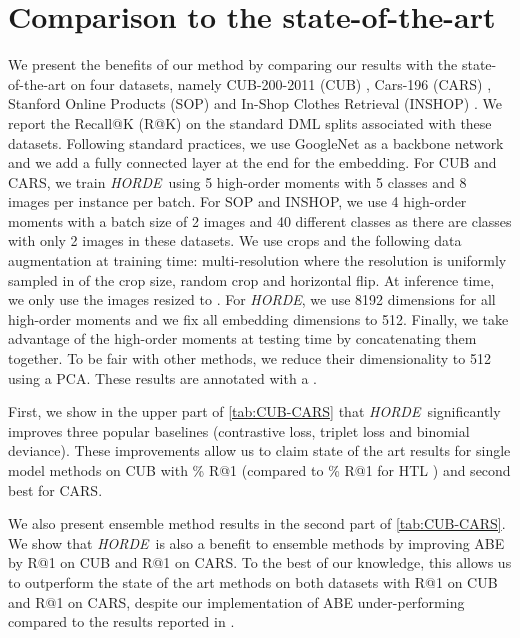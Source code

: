 \documentclass[10pt,twocolumn,letterpaper]{article}
\def\ourmethod{\textit{HORDE}}
\begin{document}
     

\section{Comparison to the state-of-the-art}\label{sec:sota}
    We present the benefits of our method by comparing our results with the state-of-the-art on four datasets, namely CUB-200-2011 (CUB) \cite{CUB_200_2011}, Cars-196 (CARS) \cite{CARS_196}, Stanford Online Products (SOP) \cite{Song_2016_CVPR} and In-Shop Clothes Retrieval (INSHOP) \cite{Liu_2016_CVPR_INSHOP}.
    We report the Recall@K (R@K) on the standard DML splits associated with these datasets.
    Following standard practices, we use GoogleNet \cite{Szegedy_2015_CVPR} as a backbone network and we add a fully connected layer at the end for the embedding.
For CUB and CARS, we train \ourmethod \ using 5 high-order moments with 5 classes and 8 images per instance per batch.
    For SOP and INSHOP, we use 4 high-order moments with a batch size of 2 images and 40 different classes as there are classes with only 2 images in these datasets.
    We use  crops and the following data augmentation at training time: multi-resolution where the resolution is uniformly sampled in  of the crop size, random crop and horizontal flip.
    At inference time, we only use the images resized to .
    For \ourmethod, we use 8192 dimensions for all high-order moments and we fix all embedding dimensions to 512.
    Finally, we take advantage of the high-order moments at testing time by concatenating them together.
    To be fair with other methods, we reduce their dimensionality to 512 using a PCA.
    These results are annotated with a .
    
    First, we show in the upper part of \autoref{tab:CUB-CARS} that \ourmethod \ significantly improves three popular baselines (contrastive loss, triplet loss and binomial deviance).
    These improvements allow us to claim state of the art results for single model methods on CUB with \% R@1 (compared to \% R@1 for HTL \cite{Ge_2018_ECCV}) and second best for CARS.
    
    We also present ensemble method results in the second part of \autoref{tab:CUB-CARS}.
    We show that \ourmethod\ is also a benefit to ensemble methods by improving ABE \cite{Kim_2018_ECCV} by  R@1 on CUB and  R@1 on CARS.
    To the best of our knowledge, this allows us to outperform the state of the art methods on both datasets with  R@1 on CUB and  R@1 on CARS, despite our implementation of ABE under-performing compared to the results reported in \cite{Kim_2018_ECCV}.
    
\end{document}

